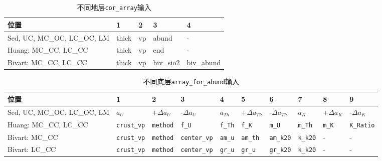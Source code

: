 				\begin{table}
					\centering
					\caption{不同地层\texttt{cor\_array}输入}
					\begin{tabular}{p{6cm}|p{2cm}p{2cm}p{2cm}p{2cm}}
						\hline
						\hline
						位置 & 1 & 2 & 3 & 4\\
						\hline
						Sed, UC, MC\_OC, LC\_OC, LM & thick & vp & abund & -\\
						\hline
						Huang: MC\_CC, LC\_CC & thick & vp & end & -\\
						\hline
						Bivart: MC\_CC, LC\_CC & thick & vp & biv\_sio2 & biv\_abund\\
						\hline
						\hline
					\end{tabular}
				\end{table}
				\begin{table}[H]
					\centering
					\caption{不同底层\texttt{array\_for\_abund}输入}
					\begin{tabular}{p{3.5cm}| p{1.5cm} p{1cm} p{1.5cm} p{1cm} p{1cm} p{1.2cm} p{1cm} p{1cm} p{1cm}}
						\hline
						\hline
						位置 & 1 & 2 & 3 & 4 & 5 & 6 & 7 & 8 & 9\\
						\hline
						Sed, UC, MC\_OC, LC\_OC, LM & $a_U$ & +$\Delta a_U$ & -$\Delta a_U$ & $a_{Th}$ & +$\Delta a_{Th} $ & -$\Delta a_{Th}$ & $a_K$ & +$\Delta a_K$ & -$\Delta a_K$\\
						\hline
						Huang: MC\_CC, LC\_CC & \texttt{crust\_vp} & \texttt{method} & \texttt{f\_U} & \texttt{f\_Th} & \texttt{f\_K} & \texttt{m\_U} & \texttt{m\_Th} & \texttt{m\_K} & \texttt{K\_Ratio}\\
						\hline
						Bivart: MC\_CC & \texttt{crust\_vp} & \texttt{method} & \texttt{center\_vp} & \texttt{am\_u} & \texttt{am\_th} & \texttt{am\_k20} & \texttt{k\_k20} & - & -\\
						Bivart: LC\_CC & \texttt{crust\_vp} & \texttt{method} & \texttt{center\_vp} & \texttt{gr\_u} & \texttt{gr\_u} & \texttt{gr\_k20} & \texttt{k\_k20} & - & -\\
						\hline
						\hline
					\end{tabular}
				\end{table}

